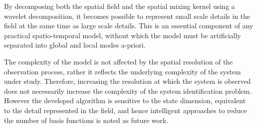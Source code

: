 \documentclass[draftcls,onecolumn]{IEEEtran}
\begin{document}
{{{By decomposing both the spatial field and the spatial mixing kernel using a wavelet decomposition, it becomes possible to represent small scale details in the field at the same time as large scale details. This is an essential component of any practical spatio-temporal model, without which the model must be artificially separated into global and local modes a-priori.


The complexity of the model is not affected by the spatial resolution of the observation process, rather it reflects the underlying complexity of the system under study. Therefore, increasing the resolution at which the system is observed does not necessarily increase the complexity of the system identification problem. However the developed algorithm is sensitive to the state dimension, equivalent to the detail represented in the field, and hence intelligent approaches to reduce the number of basis functions is noted as future work. 

}}}
\end{document}
